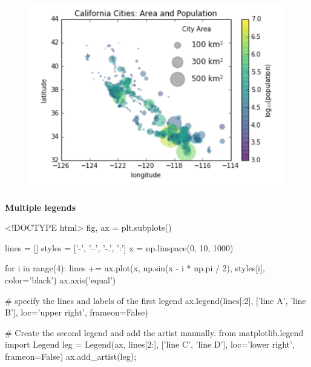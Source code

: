 \documentclass[]{book}
\newenvironment{Shaded}{\begin{snugshade}}{\end{snugshade}}
\newcommand{\DataTypeTok}[1]{\textcolor[rgb]{0.13,0.29,0.53}{#1}}
\newcommand{\NormalTok}[1]{#1}
\theoremstyle{definition}
\theoremstyle{definition}
\theoremstyle{definition}
\theoremstyle{remark}
\begin{document}
\begin{figure}
\centering
\includegraphics{images/legend4.png}
\caption{}
\end{figure}

\textbf{Multiple legends}

\begin{Shaded}
\begin{Highlighting}[]
\DataTypeTok{<!DOCTYPE }\NormalTok{html}\DataTypeTok{>}
\NormalTok{fig, ax = plt.subplots()}

\NormalTok{lines = []}
\NormalTok{styles = ['-', '--', '-.', ':']}
\NormalTok{x = np.linspace(0, 10, 1000)}

\NormalTok{for i in range(4):}
\NormalTok{    lines += ax.plot(x, np.sin(x - i * np.pi / 2),}
\NormalTok{                     styles[i], color='black')}
\NormalTok{ax.axis('equal')}

\NormalTok{# specify the lines and labels of the first legend}
\NormalTok{ax.legend(lines[:2], ['line A', 'line B'],}
\NormalTok{          loc='upper right', frameon=False)}

\NormalTok{# Create the second legend and add the artist manually.}
\NormalTok{from matplotlib.legend import Legend}
\NormalTok{leg = Legend(ax, lines[2:], ['line C', 'line D'],}
\NormalTok{             loc='lower right', frameon=False)}
\NormalTok{ax.add_artist(leg);}
\end{Highlighting}
\end{Shaded}
\end{document}
